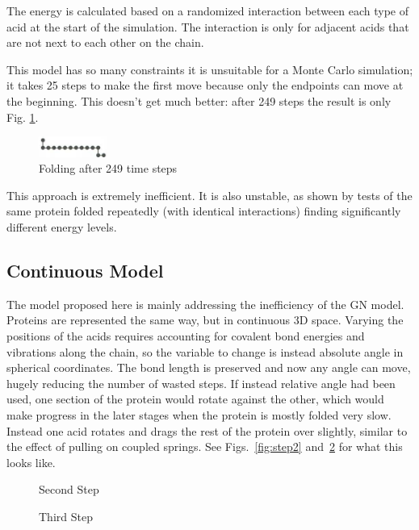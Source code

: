 \documentclass{article}
\begin{document}
		The energy is calculated based on a randomized interaction between each type of acid at the start of the simulation. The interaction is only for adjacent acids that are not next to each other on the chain.

		This model has so many constraints it is unsuitable for a Monte Carlo simulation; it takes 25 steps to make the first move because only the endpoints can move at the beginning. This doesn't get much better: after 249 steps the result is only Fig. \ref{fig:gnfold}.

		\begin{figure}[h]
			\centering
			\includegraphics[width=0.2\textwidth]{GN_fold}
		    \caption{Folding after 249 time steps \cite{GN}}
			\label{fig:gnfold}
		\end{figure}
		
		This approach is extremely inefficient. It is also unstable, as shown by tests of the same protein folded repeatedly (with identical interactions) finding significantly different energy levels.
	\subsection{Continuous Model}
	The model proposed here is mainly addressing the inefficiency of the GN model. Proteins are represented the same way, but in continuous 3D space. Varying the positions of the acids requires accounting for covalent bond energies and vibrations along the chain, so the variable to change is instead absolute angle in spherical coordinates. The bond length is preserved and now any angle can move, hugely reducing the number of wasted steps. If instead relative angle had been used, one section of the protein would rotate against the other, which would make progress in the later stages when the protein is mostly folded very slow. Instead one acid rotates and drags the rest of the protein over slightly, similar to the effect of pulling on coupled springs. See Figs.~\ref{fig:step2} and~\ref{fig:step3} for what this looks like.

	\begin{figure}[h]
	  \begin{floatrow}
	    {\caption{Second Step}
	  \label{fig:step2}}
	  {\caption{Third Step}
	  \label{fig:step3}}
	  \end{floatrow}
	\end{figure}
	
\end{document}
